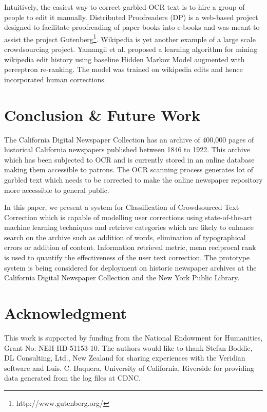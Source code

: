 \documentclass[10pt, conference, compsocconf]{IEEEtran}
\begin{document}
Intuitively, the easiest way to correct garbled OCR text is to hire a group of people to edit it manually. Distributed Proofreaders (DP) \cite{DP} is a web-based project designed to facilitate proofreading of paper books into e-books and was meant to assist the project Gutenberg\footnote{http://www.gutenberg.org/}. Wikipedia is yet another example of a large scale crowdsourcing project. Yamangil et al. \cite{wikiedits} proposed a learning algorithm for mining wikipedia edit history using baseline Hidden Markov Model augmented with perceptron re-ranking. The model was trained on wikipedia edits and hence incorporated human corrections. 



\section{Conclusion \& Future Work}
\label{sec:conc}
The California Digital Newspaper Collection has an archive of 400,000 pages of historical California newspapers published between 1846 to 1922. This archive which has been subjected to OCR and is currently stored in an online database making them accessible to patrons. The OCR scanning process generates lot of garbled text which needs to be corrected to make the online newspaper repository more accessible to general public. 

In this paper, we present a system for Classification of Crowdsourced Text Correction which is capable of modelling user corrections using state-of-the-art machine learning techniques and retrieve categories which are likely to enhance search on the archive such as addition of words, elimination of typographical errors or addition of content. Information retrieval metric, mean reciprocal rank is used to quantify the effectiveness of the user text correction. The prototype system is being considered for deployment on historic newspaper archives at the California Digital Newspaper Collection and the New York Public Library.

\section*{Acknowledgment}
This work is supported by funding from the National Endowment for Humanities, Grant No: NEH HD-51153-10. The authors would like to thank Stefan Boddie, DL Consulting, Ltd., New Zealand for sharing experiences with the Veridian software and Luis. C. Baquera, University of California, Riverside for providing data generated from the log files at CDNC.\\
\end{document}
